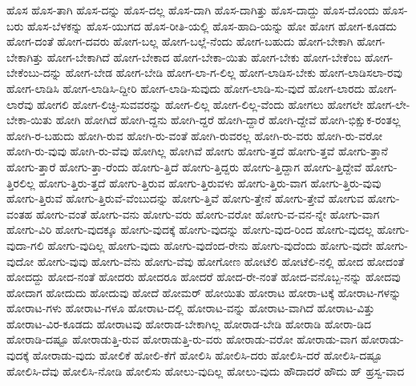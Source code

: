 {ಹೊಸ
ಹೊಸ-ತಾಗಿ
ಹೊಸ-ದನ್ನು
ಹೊಸ-ದಲ್ಲ
ಹೊಸ-ದಾಗಿ
ಹೊಸ-ದಾಗಿತ್ತು
ಹೊಸ-ದಾದ್ದು
ಹೊಸ-ದೊಂದು
ಹೊಸ-ಬರು
ಹೊಸ-ಬೆಳಕನ್ನು
ಹೊಸ-ಯುಗದ
ಹೊಸ-ರೀತಿ-ಯಲ್ಲಿ
ಹೊಸ-ಹಾದಿ-ಯನ್ನು
ಹೋ
ಹೋಗ
ಹೋಗ-ಕೂಡದು
ಹೋಗ-ದಂತೆ
ಹೋಗ-ದವರು
ಹೋಗ-ಬಲ್ಲ
ಹೋಗ-ಬಲ್ಲೆ-ನೆಂದು
ಹೋಗ-ಬಹುದು
ಹೋಗ-ಬೇಕಾಗಿ
ಹೋಗ-ಬೇಕಾಗಿತ್ತು
ಹೋಗ-ಬೇಕಾಗಿದೆ
ಹೋಗ-ಬೇಕಾದ
ಹೋಗ-ಬೇಕಾ-ಯಿತು
ಹೋಗ-ಬೇಕು
ಹೋಗ-ಬೇಕೆಂಬ
ಹೋಗ-ಬೇಕೆಂಬು-ದನ್ನು
ಹೋಗ-ಬೇಡ
ಹೋಗ-ಬೇಡಿ
ಹೋಗ-ಲಾ-ಗ-ಲಿಲ್ಲ
ಹೋಗ-ಲಾಡಿಸ-ಬೇಕು
ಹೋಗ-ಲಾಡಿಸಲಾ-ರವು
ಹೋಗ-ಲಾಡಿಸಿ
ಹೋಗ-ಲಾಡಿಸಿ-ದ್ದೀರಿ
ಹೋಗ-ಲಾಡಿ-ಸುವುದು
ಹೋಗ-ಲಾಡಿ-ಸು-ವುದೆ
ಹೋಗ-ಲಾರದು
ಹೋಗ-ಲಾರೆವು
ಹೋಗಲಿ
ಹೋಗ-ಲಿಚ್ಛಿ-ಸುವವರನ್ನು
ಹೋಗ-ಲಿಲ್ಲ
ಹೋಗ-ಲಿಲ್ಲ-ವೆಂದು
ಹೋಗಲು
ಹೋಗಲೇ
ಹೋಗ-ಲೇ-ಬೇಕಾ-ಯಿತು
ಹೋಗಿ
ಹೋಗಿದೆ
ಹೋಗಿ-ದ್ದನು
ಹೋಗಿ-ದ್ದರೆ
ಹೋಗಿ-ದ್ದಾರೆ
ಹೋಗಿ-ದ್ದೇವೆ
ಹೋಗಿ-ಭಿಕ್ಷುಕ-ರಂತಲ್ಲ
ಹೋಗಿ-ರ-ಬಹುದು
ಹೋಗಿ-ರುವ
ಹೋಗಿ-ರು-ವಂತೆ
ಹೋಗಿ-ರುವರಲ್ಲ
ಹೋಗಿ-ರು-ವರು
ಹೋಗಿ-ರು-ವರೋ
ಹೋಗಿ-ರು-ವುವು
ಹೋಗಿ-ರು-ವೆವು
ಹೋಗಿಲ್ಲ
ಹೋಗಿವೆ
ಹೋಗು
ಹೋಗು-ತ್ತದೆ
ಹೋಗು-ತ್ತವೆ
ಹೋಗು-ತ್ತಾನೆ
ಹೋಗು-ತ್ತಾರೆ
ಹೋಗು-ತ್ತಾ-ರೆಂದು
ಹೋಗು-ತ್ತಿದೆ
ಹೋಗು-ತ್ತಿದ್ದರು
ಹೋಗು-ತ್ತಿದ್ದಾಗ
ಹೋಗು-ತ್ತಿದ್ದೇವೆ
ಹೋಗು-ತ್ತಿರಲಿಲ್ಲ
ಹೋಗು-ತ್ತಿರು-ತ್ತದೆ
ಹೋಗು-ತ್ತಿರುವ
ಹೋಗು-ತ್ತಿರುವಳು
ಹೋಗು-ತ್ತಿರು-ವಾಗ
ಹೋಗು-ತ್ತಿರು-ವುವು
ಹೋಗು-ತ್ತಿರುವೆ
ಹೋಗು-ತ್ತಿರುವೆ-ವೆಂಬುದನ್ನು
ಹೋಗು-ತ್ತಿವೆ
ಹೋಗು-ತ್ತೇನೆ
ಹೋಗು-ತ್ತೇವೆ
ಹೋಗುವ
ಹೋಗು-ವಂತಹ
ಹೋಗು-ವಂತೆ
ಹೋಗು-ವನು
ಹೋಗು-ವರು
ಹೋಗು-ವರೋ
ಹೋಗು-ವ-ವನ-ನ್ನೇ
ಹೋಗು-ವಾಗ
ಹೋಗು-ವಿರಿ
ಹೋಗು-ವುದಕ್ಕೂ
ಹೋಗು-ವುದಕ್ಕೆ
ಹೋಗು-ವುದನ್ನು
ಹೋಗು-ವುದ-ರಿಂದ
ಹೋಗು-ವುದಲ್ಲ
ಹೋಗು-ವುದಾ-ಗಲಿ
ಹೋಗು-ವುದಿಲ್ಲ
ಹೋಗು-ವುದು
ಹೋಗು-ವುದೆಂದ-ರೇನು
ಹೋಗು-ವುದೆಂದು
ಹೋಗು-ವುದೇ
ಹೋಗು-ವುದೋ
ಹೋಗು-ವುವು
ಹೋಗು-ವೆನು
ಹೋಗು-ವೆವು
ಹೋಗೋಣ
ಹೋಟೆಲಿ
ಹೋಟೆಲಿ-ನಲ್ಲಿ
ಹೋದ
ಹೋದಂತೆ
ಹೋದದ್ದು
ಹೋದ-ನಂತೆ
ಹೋದರು
ಹೋದರೂ
ಹೋದರೆ
ಹೋದ-ರೇ-ನಂತೆ
ಹೋದ-ವನೊಬ್ಬ-ನನ್ನು
ಹೋದವು
ಹೋದಾಗ
ಹೋದುದು
ಹೋದುವು
ಹೋದೆ
ಹೋಮರ್
ಹೋಯಿತು
ಹೋರಾಟ
ಹೋರಾ-ಟಕ್ಕೆ
ಹೋರಾಟ-ಗಳನ್ನು
ಹೋರಾಟ-ಗಳು
ಹೋರಾಟ-ಗಳೂ
ಹೋರಾಟ-ದಲ್ಲಿ
ಹೋರಾಟ-ವನ್ನು
ಹೋರಾಟ-ವಾಗಿದೆ
ಹೋರಾಟ-ವಿತ್ತು
ಹೋರಾಟ-ವಿರ-ಕೂಡದು
ಹೋರಾಟವು
ಹೋರಾಡ-ಬೇಕಾಗಿಲ್ಲ
ಹೋರಾಡ-ಬೇಡಿ
ಹೋರಾಡಿ
ಹೋರಾ-ಡಿದ
ಹೋರಾಡಿ-ದಷ್ಟೂ
ಹೋರಾಡುತ್ತಿ-ರುವ
ಹೋರಾಡುತ್ತಿ-ರು-ವರು
ಹೋರಾಡು-ವರೋ
ಹೋರಾಡು-ವಾಗ
ಹೋರಾಡು-ವುದಕ್ಕೆ
ಹೋರಾಡು-ವುದು
ಹೋಲಿಕೆ
ಹೋಲಿ-ಕೆಗೆ
ಹೋಲಿಸಿ
ಹೋಲಿಸಿ-ದರು
ಹೋಲಿಸಿ-ದರೆ
ಹೋಲಿಸಿ-ದಷ್ಟೂ
ಹೋಲಿಸಿ-ದೆವು
ಹೋಲಿಸಿ-ನೋಡಿ
ಹೋಲಿಸು
ಹೋಲು-ವುದಿಲ್ಲ
ಹೋಲು-ವುದು
ಹೌದಾದರೆ
ಹೌದು
ಹ್
ಹ್ರಸ್ವ-ವಾದ
}
